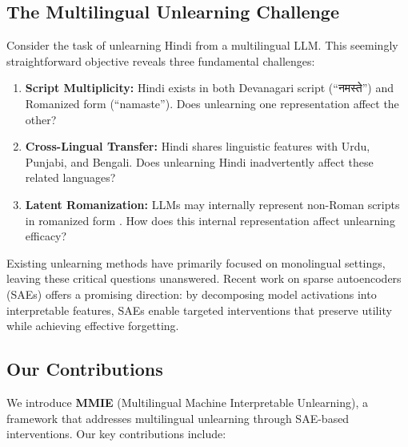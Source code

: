 \documentclass[11pt]{article}
\begin{document}
\subsection{The Multilingual Unlearning Challenge}

Consider the task of unlearning Hindi from a multilingual LLM. This seemingly straightforward objective reveals three fundamental challenges:

\begin{enumerate}
    \item \textbf{Script Multiplicity:} Hindi exists in both Devanagari script (``नमस्ते'') and Romanized form (``namaste''). Does unlearning one representation affect the other?
    \item \textbf{Cross-Lingual Transfer:} Hindi shares linguistic features with Urdu, Punjabi, and Bengali. Does unlearning Hindi inadvertently affect these related languages?
    \item \textbf{Latent Romanization:} LLMs may internally represent non-Roman scripts in romanized form \cite{wendler2024romanlens}. How does this internal representation affect unlearning efficacy?
\end{enumerate}

Existing unlearning methods \cite{jia2024muse,yao2024machine,eldan2023whos,liu2024rethinking} have primarily focused on monolingual settings, leaving these critical questions unanswered. Recent work on sparse autoencoders (SAEs) \cite{bricken2023monosemanticity,cunningham2023sparse} offers a promising direction: by decomposing model activations into interpretable features, SAEs enable targeted interventions that preserve utility while achieving effective forgetting.

\subsection{Our Contributions}

We introduce \textbf{MMIE} (Multilingual Machine Interpretable Unlearning), a framework that addresses multilingual unlearning through SAE-based interventions. Our key contributions include:
\end{document}
